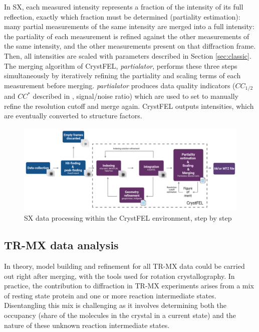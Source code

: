 In SX, each measured intensity represents a fraction of the intensity of its full reflection, exactly which fraction must be determined (partiality estimation): many partial measurements of the same intensity are merged into a full intensity: the partiality of each measurement is refined against the other measurements of the same intensity, and the other measurements present on that diffraction frame. Then, all intensities are scaled with parameters described in Section \ref{sec:classic}. The merging algorithm of CrystFEL, \textit{partialator}, performs these three steps simultaneously by iteratively refining the partiality and scaling terms of each measurement before merging. \textit{partialator} produces data quality indicators (\(CC_{1/2}\) and \(CC^\ast\) described in \cite{karplusLinkingCrystallographicModel2012,karplusAssessingMaximizingData2015}, signal/noise ratio) which are used to set to manually refine the resolution cutoff and merge again. CrystFEL outputs intensities, which are eventually converted to structure factors. 

\begin{figure}[H] %
    \centering
    \noindent \includegraphics[width=\textwidth]{images/Introduction/SX_data-processing.pdf}
    \hfill
    \caption{SX data processing within the CrystFEL environment, step by step} \label{fig:CrystFEL}
\end{figure}

\subsection{TR-MX data analysis}

In theory, model building and refinement for all TR-MX data could be carried out right after merging, with the tools used for rotation crystallography. In practice, the contribution to diffraction in TR-MX experiments arises from a mix of resting state protein and one or more reaction intermediate states. Disentangling this mix is challenging as it involves determining both the occupancy (share of the molecules in the crystal in a current state) and the nature of these unknown reaction intermediate states.


